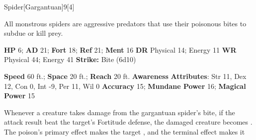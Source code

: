   \begin{monsection}{Spider}[Gargantuan]{9}[4]
    \vspace{-1em}\vspace{-1em}
    \vspace{0em}

    
    All monstrous spiders are aggressive predators that use their poisonous bites to subdue or kill prey.
  

    \begin{spellcontent}
      \begin{spelltargetinginfo}
        \pari \textbf{HP} 6;
          \textbf{AD} 21;
          \textbf{Fort} 18;
          \textbf{Ref} 21;
          \textbf{Ment} 16
        \pari \textbf{DR} Physical 14; Energy 11
        \pari \textbf{WR} Physical 44; Energy 41
        \pari \textbf{Strike:}
            Bite  (6d10)
      \end{spelltargetinginfo}
    \end{spellcontent}
    \begin{monsterfooter}
      \pari \textbf{Speed} 60 ft.;
        \textbf{Space} 20 ft.;
        \textbf{Reach} 20 ft.
      \pari \textbf{Awareness} 
      \pari \textbf{Attributes}:
        Str 11, Dex 12,
        Con 0, Int -9,
        Per 11, Wil 0
      \pari \textbf{Accuracy} 15;
        \textbf{Mundane Power} 16;
      \textbf{Magical Power} 15
    \end{monsterfooter}
  \end{monsection}
    Whenever a creature takes damage from the gargantuan spider's bite,
      if the attack result beat the target's Fortitude defense,
      the damaged creature becomes .
    The poison's primary effect makes the target , and the terminal effect makes it 
  
